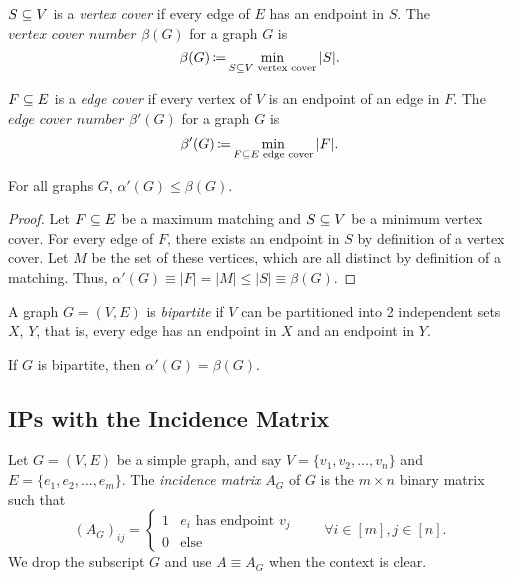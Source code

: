 \begin{defn}
    \label{def:vertex-cover}
    $S \subseteq V$ is a \textit{vertex cover} if every edge of $E$ has an endpoint in $S$. The $\textit{vertex cover number}$ $\beta(G)$ for a graph $G$ is
    \[
        \beta(G) \operatorname*{\coloneqq} \min_{S \subseteq V \text{ vertex cover}} |S|.
    \]
\end{defn}

\begin{defn}
    \label{def:edge-cover}
    $F \subseteq E$ is a \textit{edge cover} if every vertex of $V$ is an endpoint of an edge in $F$. The $\textit{edge cover number}$ $\beta'(G)$ for a graph $G$ is
    \[
        \beta'(G) \operatorname*{\coloneqq} \min_{F \subseteq E \text{ edge cover}} |F|.
    \]
\end{defn}

\begin{thm}
    \label{thm:weak-duality-matchings-vertex-covers}
    For all graphs $G$, $\alpha'(G) \le \beta(G)$.
    
    \begin{proof}
        Let $F \subseteq E$ be a maximum matching and $S \subseteq V$ be a minimum vertex cover. For every edge of $F$, there exists an endpoint in $S$ by definition of a vertex cover. Let $M$ be the set of these vertices, which are all distinct by definition of a matching. Thus, $\alpha'(G) \equiv |F| = |M| \le |S| \equiv \beta(G)$.
    \end{proof}
\end{thm}

\begin{defn}
    \label{def:bipartite-graph}
    A graph $G = (V, E)$ is \textit{bipartite} if $V$ can be partitioned into 2 independent sets $X$, $Y$, that is, every edge has an endpoint in $X$ and an endpoint in $Y$.
\end{defn}

\begin{thm}
    \label{thm:konig-egervary}
    If $G$ is bipartite, then $\alpha'(G) = \beta(G)$.
\end{thm}


\subsection{IPs with the Incidence Matrix}
\begin{defn}
    \label{def:incidence-matrix}
    Let $G = (V,E)$ be a simple graph, and say $V = \{v_1, v_2, \dots, v_n\}$ and $E = \{e_1, e_2, \dots, e_m\}$. The \textit{incidence matrix} $A_G$ of $G$ is the $m \times n$ binary matrix such that
    \[
        (A_G)_{ij} = \begin{cases}
                        1 & e_i \text{ has endpoint } v_j \\ 
                        0 & \text{else}
                     \end{cases}
        \quad \quad
        \forall i \in [m], j \in [n].
    \]
    We drop the subscript $G$ and use $A \equiv A_G$ when the context is clear.
\end{defn}

